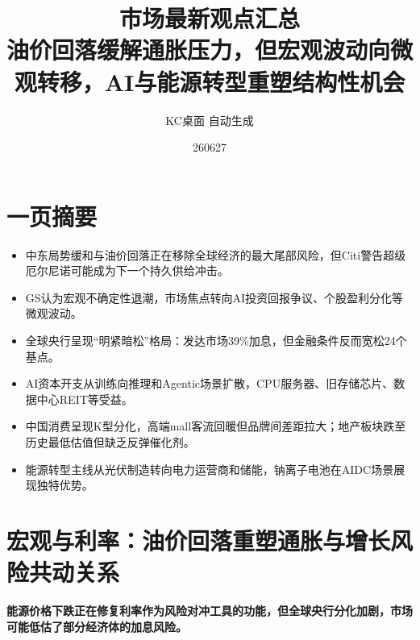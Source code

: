\documentclass[11pt]{ctexart}
\title{\textbf{市场最新观点汇总}\\[0.4em]{\large 油价回落缓解通胀压力，但宏观波动向微观转移，AI与能源转型重塑结构性机会}}
\author{KC桌面 自动生成}
\date{260627}
\begin{document}
\maketitle
\tableofcontents
\newpage
\section{一页摘要}
\begin{itemize}
  \item 中东局势缓和与油价回落正在移除全球经济的最大尾部风险，但Citi警告超级厄尔尼诺可能成为下一个持久供给冲击。
  \item GS认为宏观不确定性退潮，市场焦点转向AI投资回报争议、个股盈利分化等微观波动。
  \item 全球央行呈现“明紧暗松”格局：发达市场39\%加息，但金融条件反而宽松24个基点。
  \item AI资本开支从训练向推理和Agentic场景扩散，CPU服务器、旧存储芯片、数据中心REIT等受益。
  \item 中国消费呈现K型分化，高端mall客流回暖但品牌间差距拉大；地产板块跌至历史最低估值但缺乏反弹催化剂。
  \item 能源转型主线从光伏制造转向电力运营商和储能，钠离子电池在AIDC场景展现独特优势。
\end{itemize}
\section{宏观与利率：油价回落重塑通胀与增长风险共动关系}
\textbf{能源价格下跌正在修复利率作为风险对冲工具的功能，但全球央行分化加剧，市场可能低估了部分经济体的加息风险。}
\end{document}

